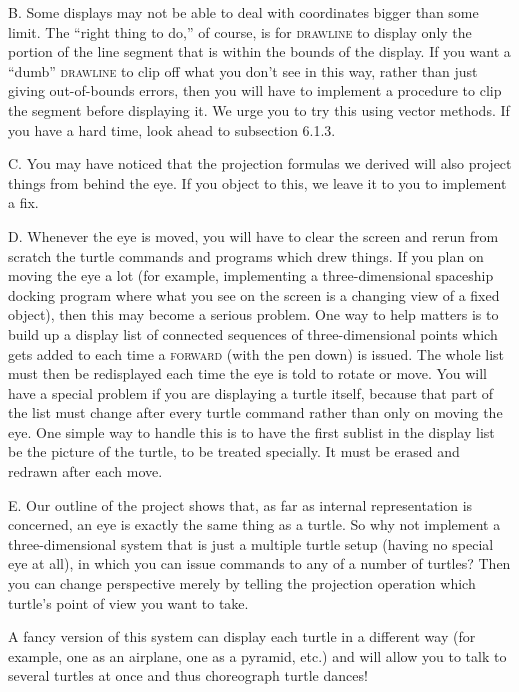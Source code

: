 \documentclass{book}
\begin{document}
B. Some displays may not be able to deal with coordinates bigger than
some limit. The ``right thing to do,'' of course, is for \textsc{drawline} to display
only the portion of the line segment that is within the bounds of the
display. If you want a ``dumb'' \textsc{drawline} to clip off what you don't see
in this way, rather than just giving out-of-bounds errors, then you will
have to implement a procedure to clip the segment before displaying it.
We urge you to try this using vector methods. If you have a hard time,
look ahead to subsection 6.1.3.

C. You may have noticed that the projection formulas we derived will 
also project things from behind the eye. If you object to this, we leave
it to you to implement a fix.

D. Whenever the eye is moved, you will have to clear the screen and rerun
from scratch the turtle commands and programs which drew things. If
you plan on moving the eye a lot (for example, implementing a three-dimensional spaceship docking program where what you see on the
screen is a changing view of a fixed object), then this may become a
serious problem. One way to help matters is to build up a display list  
of connected sequences of three-dimensional points which gets added to
each time a \textsc{forward} (with the pen down) is issued. The whole list must
then be redisplayed each time the eye is told to rotate or move. You
will have a special problem if you are displaying a turtle itself, because
that part of the list must change after every turtle command rather than
only on moving the eye. One simple way to handle this is to have the
first sublist in the display list be the picture of the turtle, to be treated
specially. It must be erased and redrawn after each move.


E. Our outline of the project shows that, as far as internal representation
is concerned, an eye is exactly the same thing as a turtle. So why not
implement a three-dimensional system that is just a multiple turtle setup
(having no special eye at all), in which you can issue commands to any of
a number of turtles? Then you can change perspective merely by telling
the projection operation which turtle's point of view you want to take.

A fancy version of this system can display each turtle in a different way
(for example, one as an airplane, one as a pyramid, etc.) and will allow
you to talk to several turtles at once and thus choreograph turtle dances!
\end{document}
